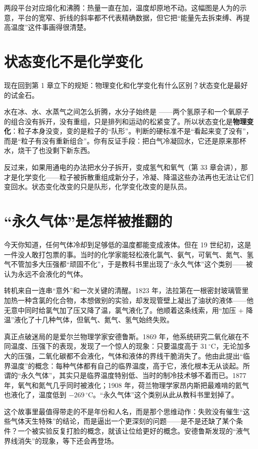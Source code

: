 两段平台对应熔化和沸腾：热量一直在加，温度却原地不动。这幅图是人为的示意，平台的宽窄、折线的斜率都不代表精确数据，但它把“能量先去拆束缚、再提高温度”这件事画得很清楚。

\section{状态变化不是化学变化}

现在回到第 1 章立下的规矩：物理变化和化学变化有什么区别？状态变化是最好的试金石。

水在冰、水、水蒸气之间怎么折腾，水分子始终是 ——两个氢原子和一个氧原子的组合没有拆开，没有重组，只是排列和运动的松紧变了。所以状态变化是\textbf{物理变化}：粒子本身没变，变的是粒子的“队形”。判断的硬标准不是“看起来变了没有”，而是“粒子有没有重新组合”。你有反证手段：把白气冷凝回水，它还是原来那杯水，烧干了也没剩下新东西。

反过来，如果用通电的办法把水分子拆开，变成氢气和氧气（第 33 章会讲），那才是化学变化——粒子被拆散重组成新分子，冷凝、降温这些办法再也无法让它们变回水。状态变化改变的只是队形，化学变化改变的是队员。
\section{“永久气体”是怎样被推翻的}

\begin{zhengju}
今天你知道，任何气体冷却到足够低的温度都能变成液体。但在 19 世纪初，这是一件没人敢打包票的事。当时的化学家能轻松液化氯气、氨气，可氧气、氮气、氢气不管加多大压强都“顽固不化”，于是教科书里出现了“永久气体”这个类别——被认为永远不会液化的气体。

转机来自一连串“意外”和一次关键的清醒。1823 年，法拉第在一根密封玻璃管里加热一种含氯的化合物，本想做别的实验，却发现管壁上凝出了油状的液体——他无意中同时给氯气加了压又降了温，氯气液化了。他顺着这条线索，用“加压 + 降温”液化了十几种气体，但氧气、氮气、氢气始终失败。

真正点破迷局的是爱尔兰物理学家安德鲁斯。1869 年，他系统研究二氧化碳在不同温度、压强下的表现，发现了一个惊人的现象：只要温度高于 $31\,^{\circ}\mathrm{C}$，无论加多大的压强，二氧化碳都不会液化，气体和液体的界线干脆消失了。他由此提出“临界温度”的概念：每种气体都有自己的临界温度，高于它，液化根本无从谈起。所谓的“永久气体”，其实只是临界温度特别低、当时的制冷技术够不着而已。1877 年，氧气和氮气几乎同时被液化；1908 年，荷兰物理学家昂内斯把最难啃的氦气也液化了，温度低到 $-269\,^{\circ}\mathrm{C}$。“永久气体”这个类别从此从教科书里划掉了。

这个故事里最值得带走的不是年份和人名，而是那个思维动作：失败没有催生“这些气体天生特殊”的结论，而是逼出一个更深刻的问题——是不是还缺了某个条件？一个被实验反复打脸的概念，就该让位给更好的概念。安德鲁斯发现的“液气界线消失”的现象，等下还会再登场。
\end{zhengju}

